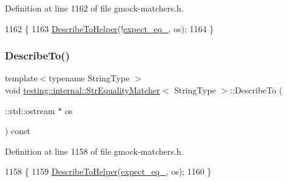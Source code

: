 Definition at line 1162 of file gmock-\/matchers.\+h.


\begin{DoxyCode}
1162                                                 \{
1163     \hyperlink{classtesting_1_1internal_1_1StrEqualityMatcher_accddf33055803fee7ff0ef7988204474}{DescribeToHelper}(!\hyperlink{classtesting_1_1internal_1_1StrEqualityMatcher_a95f7c07612ee34d8ebd1dc97c707901d}{expect\_eq\_}, os);
1164   \}
\end{DoxyCode}
\mbox{\label{classtesting_1_1internal_1_1StrEqualityMatcher_a18c05a02da6b1df1c3dbfe4870aaa3c2}} 
\subsubsection{\texorpdfstring{Describe\+To()}{DescribeTo()}}
{\footnotesize\ttfamily template$<$typename String\+Type $>$ \\
void \hyperlink{classtesting_1_1internal_1_1StrEqualityMatcher}{testing\+::internal\+::\+Str\+Equality\+Matcher}$<$ String\+Type $>$\+::Describe\+To (\begin{DoxyParamCaption}\item[{\+::std\+::ostream $\ast$}]{os }\end{DoxyParamCaption}) const\hspace{0.3cm}{\ttfamily [inline]}}



Definition at line 1158 of file gmock-\/matchers.\+h.


\begin{DoxyCode}
1158                                         \{
1159     \hyperlink{classtesting_1_1internal_1_1StrEqualityMatcher_accddf33055803fee7ff0ef7988204474}{DescribeToHelper}(\hyperlink{classtesting_1_1internal_1_1StrEqualityMatcher_a95f7c07612ee34d8ebd1dc97c707901d}{expect\_eq\_}, os);
1160   \}
\end{DoxyCode}
\mbox{\label{classtesting_1_1internal_1_1StrEqualityMatcher_accddf33055803fee7ff0ef7988204474}} 

